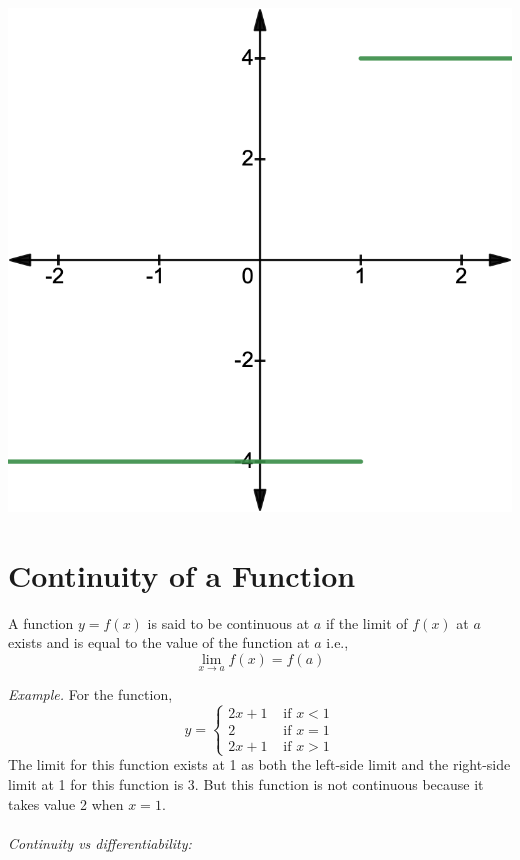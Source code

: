 \documentclass{./../Latex/handout}
\begin{document}
\begin{center}
\includegraphics[scale=0.25]{input/lim2.png}	
\end{center}

\section{Continuity of a Function}
A function $y=f(x)$ is said to be continuous at $a$ if the limit of $f(x)$ at $a$ exists and is equal to the value of the function at $a$ i.e.,
$$\lim _{x \rightarrow a} f(x) = f(a)$$

\textit{Example.} For the function,
$$ y = \begin{cases} 2x+1 &  \text{ if }x<1 \\
2 & \text{ if } x=1 \\
2x+1  &\text{ if }x>1 \end{cases} $$
The limit for this function exists at 1 as both the left-side limit and the right-side limit at 1 for this function is 3. But this function is not continuous because it takes value 2 when $x=1$. \\~\\

\textit{Continuity vs differentiability:} \\
\end{document}
